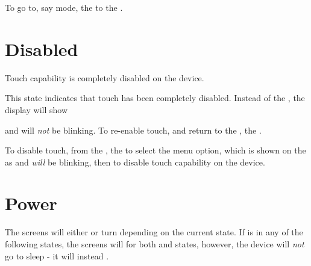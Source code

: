 To go to, say  mode,  the  to the .


\section{Disabled}  \label{Touch Settings - Disabled}

Touch capability is completely disabled on the device.

\par\medskip

This state indicates that touch has been completely disabled.  Instead of the
, the display will show

\begin{figure}[H]
\centering
\end{figure}

and will \textit{not} be blinking.  To re-enable touch, and return to the
,  the .


To disable touch, from the \hyperref[Touch - Menu]{},  the
 to select the  menu option, which
is shown on the  as  and \textit{will} be blinking, then
 to disable touch capability on the device.


\pagebreak
\section{Power}

The screens will either  or turn  depending on the current
state.  If  is in any of the following states, the screens will
 for both  and  states, however, the device will
\textit{not} go to sleep - it will instead .

